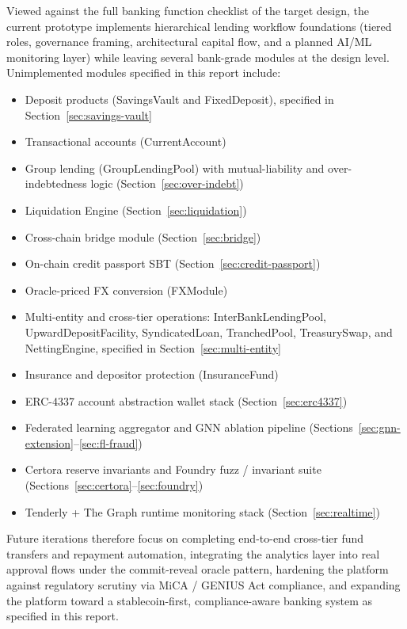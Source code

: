 \documentclass[12pt,a4paper]{report}
\begin{document}
Viewed against the full banking function checklist of the target design, the current prototype implements hierarchical lending workflow foundations (tiered roles, governance framing, architectural capital flow, and a planned AI/ML monitoring layer) while leaving several bank-grade modules at the design level. Unimplemented modules specified in this report include:
\begin{itemize}[noitemsep]
\item Deposit products (SavingsVault and FixedDeposit), specified in Section~\ref{sec:savings-vault}
\item Transactional accounts (CurrentAccount)
\item Group lending (GroupLendingPool) with mutual-liability and over-indebtedness logic (Section~\ref{sec:over-indebt})
\item Liquidation Engine (Section~\ref{sec:liquidation})
\item Cross-chain bridge module (Section~\ref{sec:bridge})
\item On-chain credit passport SBT (Section~\ref{sec:credit-passport})
\item Oracle-priced FX conversion (FXModule)
\item Multi-entity and cross-tier operations: InterBankLendingPool, UpwardDepositFacility, SyndicatedLoan, TranchedPool, TreasurySwap, and NettingEngine, specified in Section~\ref{sec:multi-entity}
\item Insurance and depositor protection (InsuranceFund)
\item ERC-4337 account abstraction wallet stack (Section~\ref{sec:erc4337})
\item Federated learning aggregator and GNN ablation pipeline (Sections~\ref{sec:gnn-extension}--\ref{sec:fl-fraud})
\item Certora reserve invariants and Foundry fuzz / invariant suite (Sections~\ref{sec:certora}--\ref{sec:foundry})
\item Tenderly + The Graph runtime monitoring stack (Section~\ref{sec:realtime})
\end{itemize}
Future iterations therefore focus on completing end-to-end cross-tier fund transfers and repayment automation, integrating the analytics layer into real approval flows under the commit-reveal oracle pattern, hardening the platform against regulatory scrutiny via MiCA / GENIUS Act compliance, and expanding the platform toward a stablecoin-first, compliance-aware banking system as specified in this report.
\end{document}
